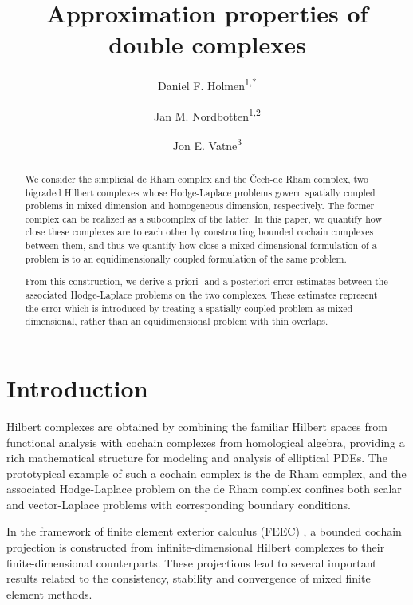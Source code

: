 \documentclass[reqno]{amsart}
\title{Approximation properties of double complexes}
\author{Daniel F. Holmen\textsuperscript{1,*}}
\author{Jan M. Nordbotten\textsuperscript{1,2}}
\author{Jon E. Vatne\textsuperscript{3}}
\date{}
\numberwithin{equation}{section}
\theoremstyle{definition}
\begin{document}
\begin{abstract}
We consider the simplicial de Rham complex and the \v{C}ech-de Rham complex, two bigraded Hilbert complexes whose Hodge-Laplace problems govern spatially coupled problems in mixed dimension and homogeneous dimension, respectively. The former complex can be realized as a subcomplex of the latter.
In this paper, we quantify how close these complexes are to each other by constructing bounded cochain complexes between them, and thus we quantify how close a mixed-dimensional formulation of a problem is to an equidimensionally coupled formulation of the same problem. 

From this construction, we derive a priori- and a posteriori error estimates between the associated Hodge-Laplace problems on the two complexes. These estimates represent the error which is introduced by treating a spatially coupled problem as mixed-dimensional, rather than an equidimensional problem with thin overlaps. 

\end{abstract}

\maketitle



\section{Introduction} \label{section: intro}
Hilbert complexes are obtained by combining the familiar Hilbert spaces from functional analysis with cochain complexes from homological algebra, providing a rich mathematical structure for modeling and analysis of elliptical PDEs. The prototypical example of such a cochain complex is the de Rham complex, and the associated Hodge-Laplace problem on the de Rham complex confines both scalar and vector-Laplace problems with corresponding boundary conditions.

In the framework of finite element exterior calculus (FEEC) \cite{arnoldFEEC3, arnoldFEEC2}, a bounded cochain projection is constructed from infinite-dimensional Hilbert complexes to their finite-dimensional counterparts. These projections lead to several important results related to the consistency, stability and convergence of mixed finite element methods. 
\end{document}
